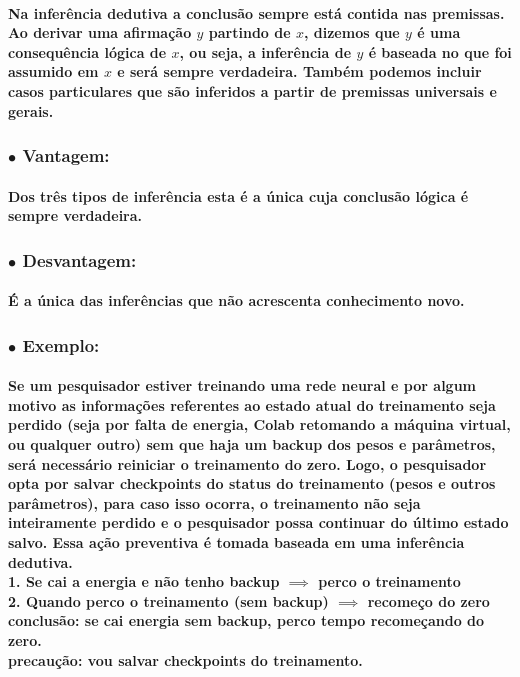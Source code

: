 \documentclass[a4paper]{article}    %
\begin{document}
\paragraph{Na inferência dedutiva a conclusão sempre está contida nas premissas. Ao derivar uma afirmação $y$ partindo de $x$, dizemos que $y$ é uma consequência lógica de $x$, ou seja, a inferência de $y$ é baseada no que foi assumido em $x$ e será sempre verdadeira. Também podemos incluir casos particulares que são inferidos a partir de premissas universais e gerais.}

\subsubsection*{\hspace{5mm}$\bullet$ Vantagem:}
\paragraph{Dos três tipos de inferência esta é a única cuja conclusão lógica é sempre verdadeira.}

\subsubsection*{\hspace{5mm}$\bullet$ Desvantagem:}
\paragraph{É a única das inferências que não acrescenta conhecimento novo.}

\subsubsection*{\hspace{5mm}$\bullet$ Exemplo:}
\paragraph{Se um pesquisador estiver treinando uma rede neural e por algum motivo as informações referentes ao estado atual do treinamento seja perdido (seja por falta de energia, Colab retomando a máquina virtual, ou qualquer outro) sem que haja um backup dos pesos e parâmetros, será necessário reiniciar o treinamento do zero. Logo, o pesquisador opta por salvar checkpoints do status do treinamento (pesos e outros parâmetros), para caso isso ocorra, o treinamento não seja inteiramente perdido e o pesquisador possa continuar do último estado salvo. Essa ação preventiva é tomada baseada em uma inferência dedutiva.\\
1. Se cai a energia e não tenho backup $\implies$ perco o treinamento\\
2. Quando perco o treinamento (sem backup) $\implies$ recomeço do zero\\
%
conclusão: se cai energia sem backup, perco tempo recomeçando do zero.\\
precaução: vou salvar checkpoints do treinamento.}
\end{document}
